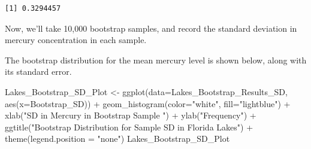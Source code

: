 \documentclass[
  letterpaper,
  DIV=11,
  numbers=noendperiod]{scrreprt}
\newenvironment{Shaded}{\begin{snugshade}}{\end{snugshade}}
\newcommand{\AttributeTok}[1]{\textcolor[rgb]{0.40,0.45,0.13}{#1}}
\newcommand{\CommentTok}[1]{\textcolor[rgb]{0.37,0.37,0.37}{#1}}
\newcommand{\ConstantTok}[1]{\textcolor[rgb]{0.56,0.35,0.01}{#1}}
\newcommand{\ControlFlowTok}[1]{\textcolor[rgb]{0.00,0.23,0.31}{#1}}
\newcommand{\DecValTok}[1]{\textcolor[rgb]{0.68,0.00,0.00}{#1}}
\newcommand{\FunctionTok}[1]{\textcolor[rgb]{0.28,0.35,0.67}{#1}}
\newcommand{\NormalTok}[1]{\textcolor[rgb]{0.00,0.23,0.31}{#1}}
\newcommand{\OtherTok}[1]{\textcolor[rgb]{0.00,0.23,0.31}{#1}}
\newcommand{\SpecialCharTok}[1]{\textcolor[rgb]{0.37,0.37,0.37}{#1}}
\newcommand{\StringTok}[1]{\textcolor[rgb]{0.13,0.47,0.30}{#1}}
\begin{document}
\begin{verbatim}
[1] 0.3294457
\end{verbatim}

Now, we'll take 10,000 bootstrap samples, and record the standard
deviation in mercury concentration in each sample.

\begin{Shaded}
\end{Shaded}

The bootstrap distribution for the mean mercury level is shown below,
along with its standard error.

\begin{Shaded}
\begin{Highlighting}[]
\NormalTok{Lakes\_Bootstrap\_SD\_Plot }\OtherTok{\textless{}{-}} \FunctionTok{ggplot}\NormalTok{(}\AttributeTok{data=}\NormalTok{Lakes\_Bootstrap\_Results\_SD, }
                                    \FunctionTok{aes}\NormalTok{(}\AttributeTok{x=}\NormalTok{Bootstrap\_SD)) }\SpecialCharTok{+}  
  \FunctionTok{geom\_histogram}\NormalTok{(}\AttributeTok{color=}\StringTok{"white"}\NormalTok{, }\AttributeTok{fill=}\StringTok{"lightblue"}\NormalTok{) }\SpecialCharTok{+}
  \FunctionTok{xlab}\NormalTok{(}\StringTok{"SD in Mercury in Bootstrap Sample "}\NormalTok{) }\SpecialCharTok{+} \FunctionTok{ylab}\NormalTok{(}\StringTok{"Frequency"}\NormalTok{) }\SpecialCharTok{+}
  \FunctionTok{ggtitle}\NormalTok{(}\StringTok{"Bootstrap Distribution for Sample SD in Florida Lakes"}\NormalTok{) }\SpecialCharTok{+} 
  \FunctionTok{theme}\NormalTok{(}\AttributeTok{legend.position =} \StringTok{"none"}\NormalTok{) }
\NormalTok{Lakes\_Bootstrap\_SD\_Plot }
\end{Highlighting}
\end{Shaded}
\end{document}
